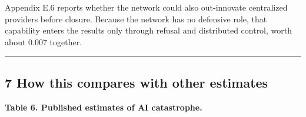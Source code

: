 \documentclass[
  10pt,
]{article}
\begin{document}
Appendix E.6 reports whether the network could also out-innovate centralized providers before
closure. Because the network has no defensive role, that capability enters the results only through
refusal and distributed control, worth about 0.007 together.

\begin{center}\rule{0.5\linewidth}{0.5pt}\end{center}

\subsection{7 How this compares with other estimates}\label{how-this-compares-with-other-estimates}

\textbf{Table 6. Published estimates of AI catastrophe.}
\end{document}
